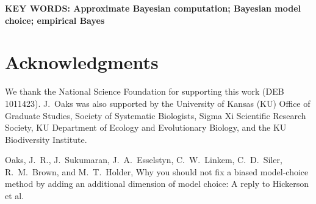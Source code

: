 \documentclass[letterpaper,12pt]{article}
\newcommand{\msTitle}{Why you should not fix a biased model-choice method by
adding an additional dimension of model choice: A reply to Hickerson et al.
\xspace}
\begin{document}
\begin{linenumbers}
{    \vspace{12pt}
    \noindent\textbf{KEY WORDS: Approximate Bayesian computation; Bayesian
        model choice; empirical Bayes} 

}

\newpage



\section*{Acknowledgments}
We thank the National Science Foundation for supporting this work (DEB
1011423).
J.\ Oaks was also supported by the University of Kansas (KU) Office of Graduate
Studies, Society of Systematic Biologists, Sigma Xi Scientific Research
Society, KU Department of Ecology and Evolutionary Biology, and the KU
Biodiversity Institute.


% 

\newpage
\singlespacing

\renewcommand\listfigurename{Figure Captions}
\renewcommand\cftdotsep{\cftnodots}
\setlength\cftbeforefigskip{10pt}
\listoffigures


\end{linenumbers}

\newpage
\singlespacing



\clearpage

\newpage



\setcounter{figure}{0}
\setcounter{table}{0}
\setcounter{page}{1}

\singlespacing

{
\renewcommand{\refname}{\noindent\MakeUppercase{\LARGE\sffamily\upshape supporting information}}
\begin{thebibliography}{1}
\providecommand{\natexlab}[1]{#1}
\providecommand{\url}[1]{\texttt{#1}}
\providecommand{\urlprefix}{URL }

Oaks, J.~R., J.~Sukumaran, J.~A.\ Esselstyn, C.~W.\ Linkem, C.~D.\ Siler,
    R.~M.\ Brown, and M.~T.\ Holder,
\newblock \msTitle

\end{thebibliography}
}

\doublespacing


\newpage
\singlespacing


\end{document}
